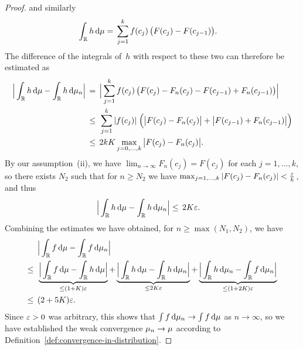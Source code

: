 \begin{proof}
  and similarly
  \begin{align*}
  \int_{\mathbb{R}} h \, \mathrm{d} \mu
  = \; & \sum_{j=1}^k f(c_j) \, \big( F(c_j) - F(c_{j-1}) \big) .
  \end{align*}
  The difference of the integrals of~$h$ with respect to these two can
  therefore be estimated as
  \begin{align*}
  \Big| \int_{\mathbb{R}} h \, \mathrm{d} \mu - \int_{\mathbb{R}} h \, \mathrm{d} \mu_n \Big|
  \, = \; & \, \Big| \sum_{j=1}^k f(c_j) \,
      \big( F(c_j) - F_n(c_j) - F(c_{j-1}) +  F_n (c_{j-1}) \big) \Big| \\
  \leq \; & \, \sum_{j=1}^k |f(c_j)| \; \Big(
      \big| F(c_j) - F_n(c_j) \big| + \big| F(c_{j-1}) +  F_n (c_{j-1}) \big|
      \Big) \\
  \leq \; & \, 2 k K \max_{j = 0 , \ldots , k} \big| F(c_j) - F_n(c_j) \big| .
  \end{align*}
  By our assumption~\textup{(ii)}, we have
  $\lim_{n \to \infty} F_n(c_j) = F(c_j)$ for each $j = 1 , \ldots, k$, so
  there exists $N_2$ such that for $n \geq N_2$ we have
  $\max_{j = 1 , \ldots , k} | F(c_j) - F_n(c_j) | < \frac{\varepsilon}{k}$, and
  thus
  \begin{align*}
  \Big| \int_{\mathbb{R}} h \, \mathrm{d} \mu - \int_{\mathbb{R}} h \, \mathrm{d} \mu_n \Big|
  \leq \; & \, 2 K \varepsilon .
  \end{align*}
  Combining the estimates we have obtained, for $n \geq \max(N_1 , N_2)$, we have
  \begin{align*}
  & \Big| \int_{\mathbb{R}} f \, \mathrm{d} \mu - \int_{\mathbb{R}} f \, \mathrm{d} \mu_n \Big| \\
  \leq \; \, &
      \underbrace{
      \Big| \int_{\mathbb{R}} f \, \mathrm{d} \mu - \int_{\mathbb{R}} h \, \mathrm{d} \mu \Big|}_{
          \leq (1+K) \varepsilon}
      + \underbrace{
      \Big| \int_{\mathbb{R}} h \, \mathrm{d} \mu - \int_{\mathbb{R}} h \, \mathrm{d} \mu_n \Big|}_{
          \leq 2 K \varepsilon}
      + \underbrace{
      \Big| \int_{\mathbb{R}} h \, \mathrm{d} \mu_n - \int_{\mathbb{R}} f \, \mathrm{d} \mu_n	\Big|}_{
          \leq (1+2K) \varepsilon } \\
  \leq \; \, & (2 + 5 K) \varepsilon .
  \end{align*}
  Since $\varepsilon > 0$ was arbitrary, this shows that
  $\int f \, \mathrm{d} \mu_n \to \int f \, \mathrm{d} \mu$ as $n \to \infty$, so we
  have established the weak convergence $\mu_n \to \mu$
  according to Definition~\ref{def:convergence-in-distribution}.
\end{proof}
